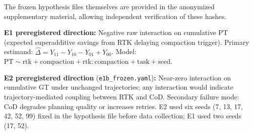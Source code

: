 \documentclass{article}
\newif\ifanon\anontrue
\begin{document}
The frozen hypothesis files themselves are provided in the \ifanon anonymized supplementary material\else reproducibility archive~\citep{cab_dataset2026}\fi, allowing independent verification of these hashes.

\textbf{E1 preregistered direction:} Negative raw interaction on cumulative PT (expected superadditive savings from RTK delaying compaction trigger). Primary estimand: $\hat{\Delta}=Y_{11}-Y_{10}-Y_{01}+Y_{00}$. Model: $\mathrm{PT}\sim \mathrm{rtk}+\mathrm{compaction}+\mathrm{rtk}{:}\mathrm{compaction}+\mathrm{task}+\mathrm{seed}$.

\textbf{E2 preregistered direction} (\texttt{e1b\_frozen.yaml})\textbf{:} Near-zero interaction on cumulative GT under unchanged trajectories; any interaction would indicate trajectory-mediated coupling between RTK and CoD. Secondary failure mode: CoD degrades planning quality or increases retries. E2 used six seeds (7, 13, 17, 42, 52, 99) fixed in the hypothesis file before data collection; E1 used two seeds (17, 52).



\end{document}
